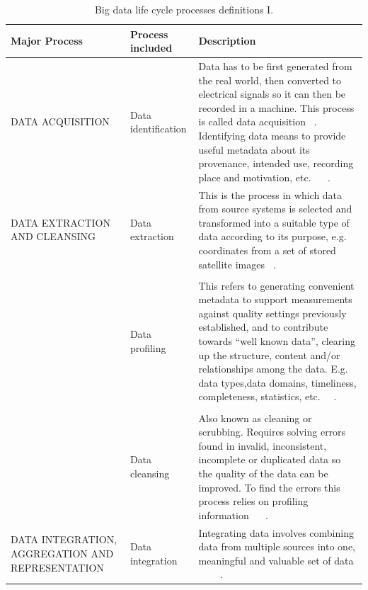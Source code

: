 \begin{table}[H]
    \caption{Big data life cycle processes definitions I.}
    \label{table:big_data_life_cyle_processes_definition_I}
    \centering
    \begin{tabular}{p{4.0cm} p{3.1cm} p{7cm}}
    \toprule
    \textbf{Major Process} & \textbf{Process included} & \textbf{Description} \\ 
    \bottomrule
    DATA ACQUISITION & Data identification & Data has to be first generated from the
    real world, then converted to electrical signals so it can then be recorded
    in a machine. This process is called data acquisition  ~\cite{ComputingResearchAssociation}. Identifying
    data means to provide useful metadata about its provenance, intended use, recording place and motivation,
    etc. ~\cite{Dataone2016} ~\cite{Microsoft2016}. \\
    DATA EXTRACTION AND CLEANSING &  Data extraction & This is the process in which data from
    source systems is selected and transformed into a suitable type of data according to its purpose, e.g. coordinates from a set of stored satellite images ~\cite{ComputingResearchAssociation}.    
    \\
    & \\ &  Data profiling & This refers to generating convenient metadata to 
    support measurements against quality settings previously established, and to contribute towards
    “well known data”, clearing up the structure, content and/or relationships among the data. E.g. data types,data domains, timeliness, completeness, statistics, etc.~\cite{Sandra2015} ~\cite{Kimball2008}.
    \\
    & \\ & Data cleansing & Also known as cleaning or scrubbing.
    Requires solving errors found in invalid, inconsistent, incomplete or duplicated data so the quality of the data
    can be improved. To find the errors this process relies on profiling information ~\cite{Sandra2015} ~\cite{Erhard2000}.
    \\ 
    DATA INTEGRATION, AGGREGATION AND REPRESENTATION & Data integration & Integrating data involves combining data from multiple sources into one,
    meaningful and valuable set of data ~\cite{Lenzerini2002} ~\cite{Halevy2006} ~\cite{Sandra2015}.
    \\
    \bottomrule
\end{tabular}
\end{table}

